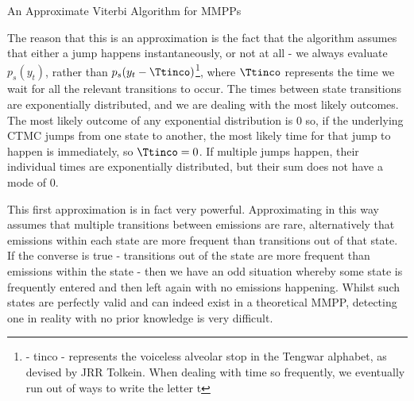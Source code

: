 \begin{algorithm}
\SetAlgoLined
{}

\caption{An Approximate Viterbi Algorithm for MMPPs}

\end{algorithm}

The reason that this is an approximation is the fact that the algorithm assumes that either a jump happens instantaneously, or not at all - we always evaluate $p_s(y_t)$, rather than $p_s(y_t-\tengt)$\footnote{\tengt - tinco - represents the voiceless alveolar stop in the Tengwar alphabet, as devised by JRR Tolkein. When dealing with time so frequently, we eventually run out of ways to write the letter t}, where $\tengt$ represents the time we wait for all the relevant transitions to occur. The times between state transitions are exponentially distributed, and we are dealing with the most likely outcomes. The most likely outcome of any exponential distribution is $0$ so, if the underlying CTMC jumps from one state to another, the most likely time for that jump to happen is immediately, so $\tengt = 0$. If multiple jumps happen, their individual times are exponentially distributed, but their sum does not have a mode of 0.

This first approximation is in fact very powerful. Approximating in this way assumes that multiple transitions between emissions are rare, alternatively  that emissions within each state are more frequent than transitions out of that state. If the converse is true - transitions out of the state are more frequent than emissions within the state - then we have an odd situation whereby some state is frequently entered and then left again with no emissions happening. Whilst such states are perfectly valid and can indeed exist in a theoretical MMPP, detecting one in reality with no prior knowledge is very difficult.

